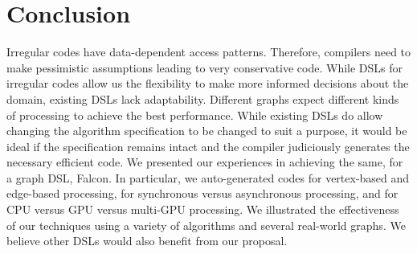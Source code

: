 \section{Conclusion}\label{sec:conclusion}
Irregular codes have data-dependent access patterns.
Therefore, compilers need to make pessimistic assumptions leading to very conservative code.
While DSLs for irregular codes allow us the flexibility to make more informed decisions about the domain, existing DSLs lack adaptability.
Different graphs expect different kinds of processing to achieve the best performance.
While existing DSLs do allow changing the algorithm specification to be changed to suit a purpose, it would be ideal if the specification remains intact and the compiler judiciously generates the necessary efficient code.
We presented our experiences in achieving the same, for a graph DSL, Falcon.
In particular, we auto-generated codes for vertex-based and edge-based processing, for synchronous versus asynchronous processing, and for CPU versus GPU versus multi-GPU processing.
We illustrated the effectiveness of our techniques using a variety of algorithms and several real-world graphs.
We believe other DSLs would also benefit from our proposal.
